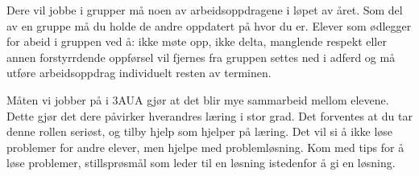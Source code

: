 \documentclass[12pt,a4paper]{book}
\begin{document}
\noindent
{} Dere vil jobbe i grupper må noen av arbeidsoppdragene i løpet av året. Som del av en gruppe må du holde de andre oppdatert på hvor du er. Elever som ødlegger for abeid i gruppen  ved å: ikke møte opp, ikke delta, manglende respekt eller annen forstyrrdende oppførsel vil fjernes fra gruppen settes ned i adferd og må utføre arbeidsoppdrag individuelt resten av terminen. 
\vskip 10pt

\noindent
{} Måten vi jobber på i 3AUA gjør at det blir mye sammarbeid mellom elevene. Dette gjør det dere påvirker hverandres læring i stor grad. Det forventes at du tar denne rollen seriøst, og tilby hjelp som hjelper på læring. Det vil si å ikke løse problemer for andre elever, men hjelpe med problemløsning. Kom med tips for å løse problemer, stillsprøsmål som leder til en løsning istedenfor å gi en løsning. 
\vskip 10pt



%
\end{document}
